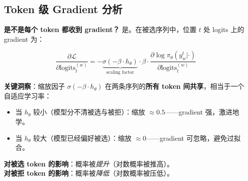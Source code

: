 \subsection{Token 级 Gradient 分析}
\label{token-level-gradient-analysis}

\textbf{是不是每个 token 都收到 gradient？} 是。在被选序列中，位置 $t$ 处 logits 上的 gradient 为：

\begin{equation}
\frac{\partial \mathcal{L}}{\partial \text{logits}_t^{(w)}} = -\underbrace{\sigma(-\beta \cdot h_\theta)}_{\text{scaling factor}} \cdot \beta \cdot \frac{\partial \log\pi_\theta(y_w^t | \cdot)}{\partial \text{logits}_t^{(w)}}
\end{equation}

\textbf{关键洞察}：缩放因子 $\sigma(-\beta \cdot h_\theta)$ 在两条序列的\textbf{所有 token 间共享}，相当于一个自适应学习率：

\begin{itemize}
  \item 当 $h_\theta$ 较小（模型分不清被选与被拒）：缩放 $\approx 0.5$——gradient 强，激进地学。
  \item 当 $h_\theta$ 较大（模型已经偏好被选）：缩放 $\approx 0$——gradient 可忽略，避免过拟合。
\end{itemize}

\textbf{对被选 token 的影响}：概率被\emph{提升}（对数概率被推高）。\\

\textbf{对被拒 token 的影响}：概率被\emph{降低}（对数概率被压低）。\\

